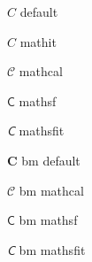 \documentclass{article}
\begin{document}
$C$ default

$\mathit{C}$ mathit

$\mathcal{C}$ mathcal

$\mathsf{C}$ mathsf

$\mathsfit{C}$ mathsfit

$\bm{C}$ bm default

$\bm{\mathcal{C}}$ bm mathcal

$\bm{\mathsf{C}}$ bm mathsf

$\bm{\mathsfit{C}}$ bm mathsfit
\end{document}
